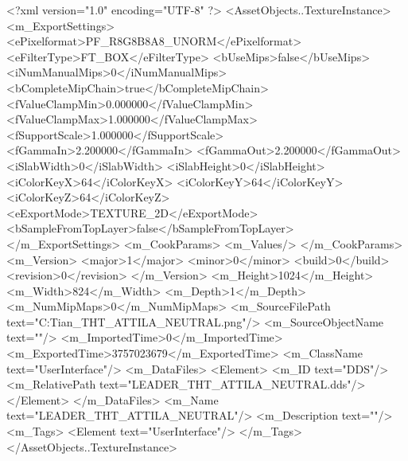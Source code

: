 <?xml version="1.0" encoding="UTF-8" ?>
<AssetObjects..TextureInstance>
	<m_ExportSettings>
		<ePixelformat>PF_R8G8B8A8_UNORM</ePixelformat>
		<eFilterType>FT_BOX</eFilterType>
		<bUseMips>false</bUseMips>
		<iNumManualMips>0</iNumManualMips>
		<bCompleteMipChain>true</bCompleteMipChain>
		<fValueClampMin>0.000000</fValueClampMin>
		<fValueClampMax>1.000000</fValueClampMax>
		<fSupportScale>1.000000</fSupportScale>
		<fGammaIn>2.200000</fGammaIn>
		<fGammaOut>2.200000</fGammaOut>
		<iSlabWidth>0</iSlabWidth>
		<iSlabHeight>0</iSlabHeight>
		<iColorKeyX>64</iColorKeyX>
		<iColorKeyY>64</iColorKeyY>
		<iColorKeyZ>64</iColorKeyZ>
		<eExportMode>TEXTURE_2D</eExportMode>
		<bSampleFromTopLayer>false</bSampleFromTopLayer>
	</m_ExportSettings>
	<m_CookParams>
		<m_Values/>
	</m_CookParams>
	<m_Version>
		<major>1</major>
		<minor>0</minor>
		<build>0</build>
		<revision>0</revision>
	</m_Version>
	<m_Height>1024</m_Height>
	<m_Width>824</m_Width>
	<m_Depth>1</m_Depth>
	<m_NumMipMaps>0</m_NumMipMaps>
	<m_SourceFilePath text="C:\Users\Troy Tian\Downloads\LEADER_THT_ATTILA_NEUTRAL.png"/>
	<m_SourceObjectName text=""/>
	<m_ImportedTime>0</m_ImportedTime>
	<m_ExportedTime>3757023679</m_ExportedTime>
	<m_ClassName text="UserInterface"/>
	<m_DataFiles>
		<Element>
			<m_ID text="DDS"/>
			<m_RelativePath text="LEADER_THT_ATTILA_NEUTRAL.dds"/>
		</Element>
	</m_DataFiles>
	<m_Name text="LEADER_THT_ATTILA_NEUTRAL"/>
	<m_Description text=""/>
	<m_Tags>
		<Element text="UserInterface"/>
	</m_Tags>
</AssetObjects..TextureInstance>

